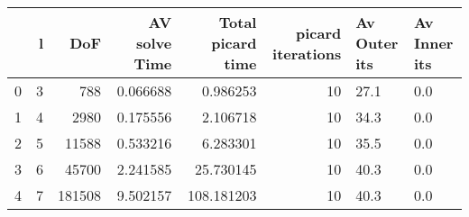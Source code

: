 \begin{tabular}{lrrrrrll}
\toprule
{} &  l &     DoF &  AV solve Time &  Total picard time &  picard iterations & Av Outer its & Av Inner its \\
\midrule
0 &  3 &     788 &       0.066688 &           0.986253 &                 10 &         27.1 &          0.0 \\
1 &  4 &    2980 &       0.175556 &           2.106718 &                 10 &         34.3 &          0.0 \\
2 &  5 &   11588 &       0.533216 &           6.283301 &                 10 &         35.5 &          0.0 \\
3 &  6 &   45700 &       2.241585 &          25.730145 &                 10 &         40.3 &          0.0 \\
4 &  7 &  181508 &       9.502157 &         108.181203 &                 10 &         40.3 &          0.0 \\
\bottomrule
\end{tabular}
